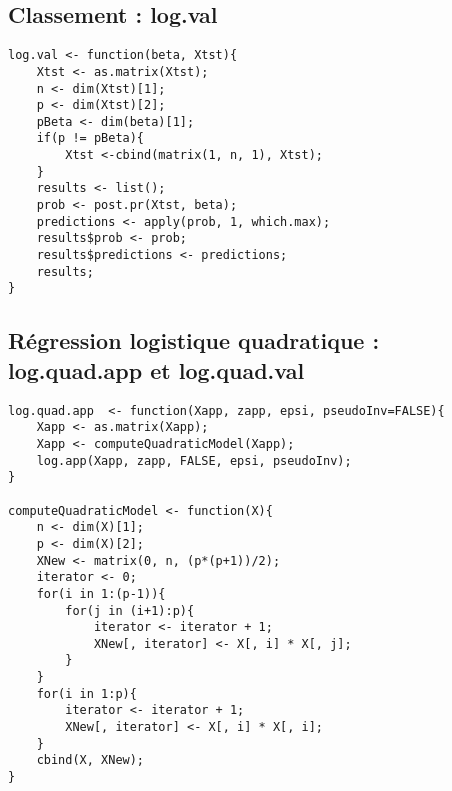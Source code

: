 \documentclass{article}
\begin{document}
\begin{multicols}{2}
\subsection{Classement : log.val}
\label{app_subsec_reg_log_val}

\begin{lstlisting}
log.val <- function(beta, Xtst){
	Xtst <- as.matrix(Xtst);
	n <- dim(Xtst)[1];
	p <- dim(Xtst)[2];
	pBeta <- dim(beta)[1];
	if(p != pBeta){ 
		Xtst <-cbind(matrix(1, n, 1), Xtst);
	}
 	results <- list();
 	prob <- post.pr(Xtst, beta);
 	predictions <- apply(prob, 1, which.max);
 	results$prob <- prob;
 	results$predictions <- predictions;
 	results;
}
\end{lstlisting}

\subsection{Régression logistique quadratique : log.quad.app et  log.quad.val}
\label{app_subsec_reg_log_val_app_quad}

\begin{lstlisting}
log.quad.app  <- function(Xapp, zapp, epsi, pseudoInv=FALSE){
	Xapp <- as.matrix(Xapp);
	Xapp <- computeQuadraticModel(Xapp);
	log.app(Xapp, zapp, FALSE, epsi, pseudoInv);
}

computeQuadraticModel <- function(X){
	n <- dim(X)[1];
	p <- dim(X)[2];
	XNew <- matrix(0, n, (p*(p+1))/2);
	iterator <- 0;
	for(i in 1:(p-1)){
		for(j in (i+1):p){
			iterator <- iterator + 1;
			XNew[, iterator] <- X[, i] * X[, j]; 
		}
	}
	for(i in 1:p){
		iterator <- iterator + 1;
		XNew[, iterator] <- X[, i] * X[, i]; 
	}
 	cbind(X, XNew);
}
\end{lstlisting}

\end{multicols}
\end{document}
